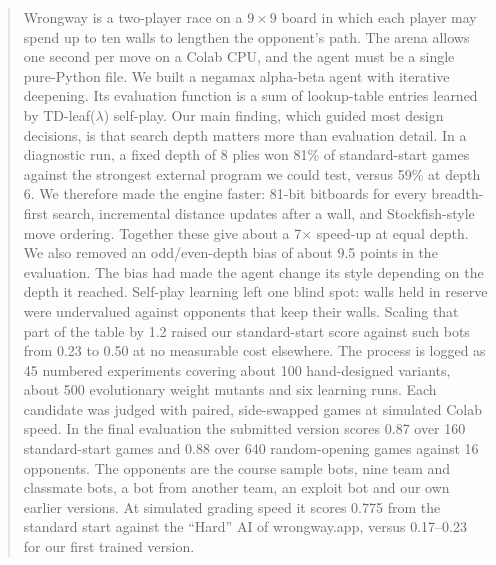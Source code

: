 \begin{abstract}
\noindent
Wrongway is a two-player race on a $9\times9$ board in which each player may spend up to ten
walls to lengthen the opponent's path. The arena allows one second per move on a Colab CPU, and
the agent must be a single pure-Python file. We built a negamax alpha-beta agent with iterative
deepening. Its evaluation function is a sum of lookup-table entries learned by TD-leaf($\lambda$)
self-play.
Our main finding, which guided most design decisions, is that search depth matters more than
evaluation detail. In a diagnostic run, a fixed depth of 8 plies won 81\% of standard-start games
against the strongest external program we could test, versus 59\% at depth 6. We therefore made
the engine faster: 81-bit bitboards for every breadth-first search, incremental distance updates
after a wall, and Stockfish-style move ordering. Together these give about a 7$\times$ speed-up at
equal depth.
We also removed an odd/even-depth bias of about 9.5 points in the evaluation. The bias had made
the agent change its style depending on the depth it reached.
Self-play learning left one blind spot: walls held in reserve were undervalued against
opponents that keep their walls. Scaling that part of the table by 1.2 raised our standard-start
score against such bots from 0.23 to 0.50 at no measurable cost elsewhere.
The process is logged as 45 numbered experiments covering about 100 hand-designed variants,
about 500 evolutionary weight mutants and six learning runs. Each candidate was judged with
paired, side-swapped games at simulated Colab speed.
In the final evaluation the submitted version scores 0.87 over 160 standard-start games and
0.88 over 640 random-opening games against 16 opponents. The opponents are the course sample
bots, nine team and classmate bots, a bot from another team, an exploit bot and our own earlier
versions.
At simulated grading speed it scores 0.775 from the standard start against the ``Hard'' AI of
wrongway.app, versus 0.17--0.23 for our first trained version.
\end{abstract}
